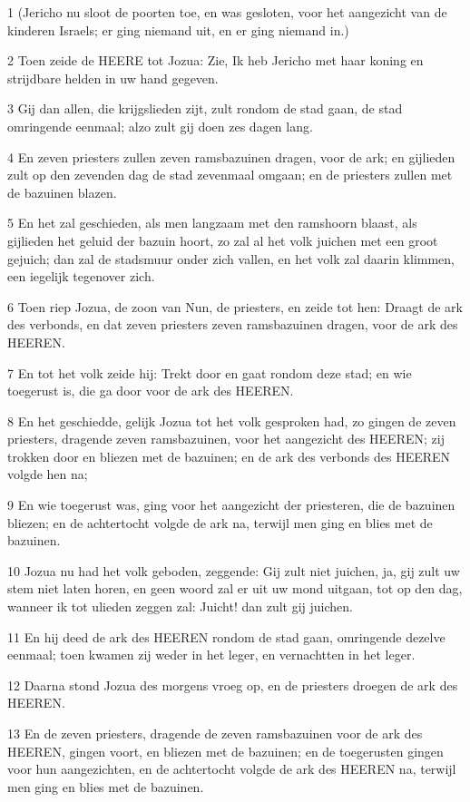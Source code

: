 \par 1 (Jericho nu sloot de poorten toe, en was gesloten, voor het aangezicht van de kinderen Israels; er ging niemand uit, en er ging niemand in.)
\par 2 Toen zeide de HEERE tot Jozua: Zie, Ik heb Jericho met haar koning en strijdbare helden in uw hand gegeven.
\par 3 Gij dan allen, die krijgslieden zijt, zult rondom de stad gaan, de stad omringende eenmaal; alzo zult gij doen zes dagen lang.
\par 4 En zeven priesters zullen zeven ramsbazuinen dragen, voor de ark; en gijlieden zult op den zevenden dag de stad zevenmaal omgaan; en de priesters zullen met de bazuinen blazen.
\par 5 En het zal geschieden, als men langzaam met den ramshoorn blaast, als gijlieden het geluid der bazuin hoort, zo zal al het volk juichen met een groot gejuich; dan zal de stadsmuur onder zich vallen, en het volk zal daarin klimmen, een iegelijk tegenover zich.
\par 6 Toen riep Jozua, de zoon van Nun, de priesters, en zeide tot hen: Draagt de ark des verbonds, en dat zeven priesters zeven ramsbazuinen dragen, voor de ark des HEEREN.
\par 7 En tot het volk zeide hij: Trekt door en gaat rondom deze stad; en wie toegerust is, die ga door voor de ark des HEEREN.
\par 8 En het geschiedde, gelijk Jozua tot het volk gesproken had, zo gingen de zeven priesters, dragende zeven ramsbazuinen, voor het aangezicht des HEEREN; zij trokken door en bliezen met de bazuinen; en de ark des verbonds des HEEREN volgde hen na;
\par 9 En wie toegerust was, ging voor het aangezicht der priesteren, die de bazuinen bliezen; en de achtertocht volgde de ark na, terwijl men ging en blies met de bazuinen.
\par 10 Jozua nu had het volk geboden, zeggende: Gij zult niet juichen, ja, gij zult uw stem niet laten horen, en geen woord zal er uit uw mond uitgaan, tot op den dag, wanneer ik tot ulieden zeggen zal: Juicht! dan zult gij juichen.
\par 11 En hij deed de ark des HEEREN rondom de stad gaan, omringende dezelve eenmaal; toen kwamen zij weder in het leger, en vernachtten in het leger.
\par 12 Daarna stond Jozua des morgens vroeg op, en de priesters droegen de ark des HEEREN.
\par 13 En de zeven priesters, dragende de zeven ramsbazuinen voor de ark des HEEREN, gingen voort, en bliezen met de bazuinen; en de toegerusten gingen voor hun aangezichten, en de achtertocht volgde de ark des HEEREN na, terwijl men ging en blies met de bazuinen.
